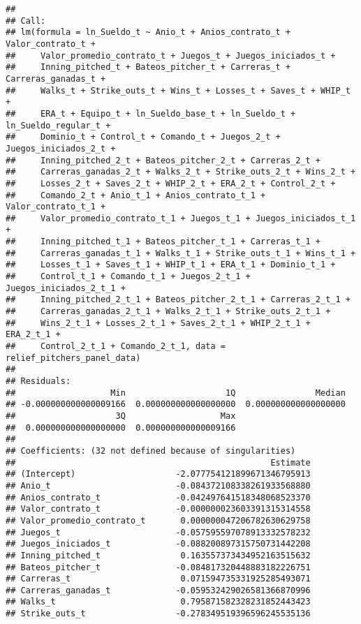 \documentclass[
]{article}
\begin{document}
\begin{verbatim}
## 
## Call:
## lm(formula = ln_Sueldo_t ~ Anio_t + Anios_contrato_t + Valor_contrato_t + 
##     Valor_promedio_contrato_t + Juegos_t + Juegos_iniciados_t + 
##     Inning_pitched_t + Bateos_pitcher_t + Carreras_t + Carreras_ganadas_t + 
##     Walks_t + Strike_outs_t + Wins_t + Losses_t + Saves_t + WHIP_t + 
##     ERA_t + Equipo_t + ln_Sueldo_base_t + ln_Sueldo_t + ln_Sueldo_regular_t + 
##     Dominio_t + Control_t + Comando_t + Juegos_2_t + Juegos_iniciados_2_t + 
##     Inning_pitched_2_t + Bateos_pitcher_2_t + Carreras_2_t + 
##     Carreras_ganadas_2_t + Walks_2_t + Strike_outs_2_t + Wins_2_t + 
##     Losses_2_t + Saves_2_t + WHIP_2_t + ERA_2_t + Control_2_t + 
##     Comando_2_t + Anio_t_1 + Anios_contrato_t_1 + Valor_contrato_t_1 + 
##     Valor_promedio_contrato_t_1 + Juegos_t_1 + Juegos_iniciados_t_1 + 
##     Inning_pitched_t_1 + Bateos_pitcher_t_1 + Carreras_t_1 + 
##     Carreras_ganadas_t_1 + Walks_t_1 + Strike_outs_t_1 + Wins_t_1 + 
##     Losses_t_1 + Saves_t_1 + WHIP_t_1 + ERA_t_1 + Dominio_t_1 + 
##     Control_t_1 + Comando_t_1 + Juegos_2_t_1 + Juegos_iniciados_2_t_1 + 
##     Inning_pitched_2_t_1 + Bateos_pitcher_2_t_1 + Carreras_2_t_1 + 
##     Carreras_ganadas_2_t_1 + Walks_2_t_1 + Strike_outs_2_t_1 + 
##     Wins_2_t_1 + Losses_2_t_1 + Saves_2_t_1 + WHIP_2_t_1 + ERA_2_t_1 + 
##     Control_2_t_1 + Comando_2_t_1, data = relief_pitchers_panel_data)
## 
## Residuals:
##                   Min                    1Q                Median 
## -0.000000000000009166  0.000000000000000000  0.000000000000000000 
##                    3Q                   Max 
##  0.000000000000000000  0.000000000000009166 
## 
## Coefficients: (32 not defined because of singularities)
##                                                   Estimate
## (Intercept)                    -2.077754121899671346795913
## Anio_t                         -0.084372108338261933568880
## Anios_contrato_t               -0.042497641518348068523370
## Valor_contrato_t               -0.000000023603391315314558
## Valor_promedio_contrato_t       0.000000047206782630629758
## Juegos_t                       -0.057595597078913332578232
## Juegos_iniciados_t             -0.088200897315750731442208
## Inning_pitched_t                0.163557373434952163515632
## Bateos_pitcher_t               -0.084817320448883182226751
## Carreras_t                      0.071594735331925285493071
## Carreras_ganadas_t             -0.059532429026581366870996
## Walks_t                         0.795871582328231852443423
## Strike_outs_t                  -0.278349519396596245535136

\end{verbatim}
\end{document}

